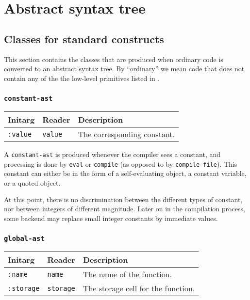 \chapter{Abstract syntax tree}
\label{chap-abstract-syntax-tree}

\section{Classes for standard \cl{} constructs}

This section contains the classes that are produced when ordinary
\cl{} code is converted to an abstract syntax tree.  By ``ordinary''
we mean code that does not contain any of the the low-level primitives
listed in . 

\subsection{\texttt{constant-ast}}

\begin{tabular}{|l|l|l|}
\hline
Initarg & Reader & Description\\
\hline\hline
\texttt{:value} & \texttt{value} & The corresponding constant.\\
\hline
\end{tabular}

A \texttt{constant-ast} is produced whenever the compiler sees a
constant, and processing is done by \texttt{eval} or \texttt{compile}
(as opposed to by \texttt{compile-file}).  This constant can either be
in the form of a self-evaluating object, a constant variable, or a
quoted object.

At this point, there is no discrimination between the different types
of constant, nor between integers of different magnitude.  Later on
in the compilation process, some backend may replace small integer
constants by immediate values. 

\subsection{\texttt{global-ast}}

\begin{tabular}{|l|l|l|}
\hline
Initarg & Reader & Description\\
\hline\hline
\texttt{:name} & \texttt{name} & The name of the function.\\  
\hline
\texttt{:storage} & \texttt{storage} & The storage cell for the function.\\
\hline
\end{tabular}


